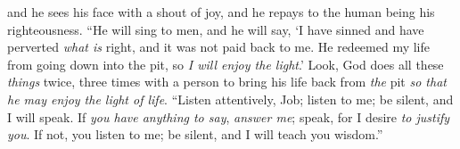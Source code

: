 \begin{biblechapter}
and he sees his face with a shout of joy, 
and he repays to the human being his righteousness.
\verse “He will sing to men, and he will say, 
‘I have sinned and have perverted \textit{what is} right, 
and it was not paid back to me.
\verse He redeemed my life from going down into the pit, 
so \textit{I will enjoy the light}.’
\verse Look, God does all these \textit{things} 
twice, three times with a person
\verse to bring his life back from \textit{the} pit 
\textit{so that he may enjoy the light of life}.
\verse “Listen attentively, Job; listen to me; 
be silent, and I will speak.
\verse If \textit{you have anything to say}, \textit{answer me}; 
speak, for I desire \textit{to justify you}.
\verse If not, you listen to me; 
be silent, and I will teach you wisdom.”
\end{biblechapter}

